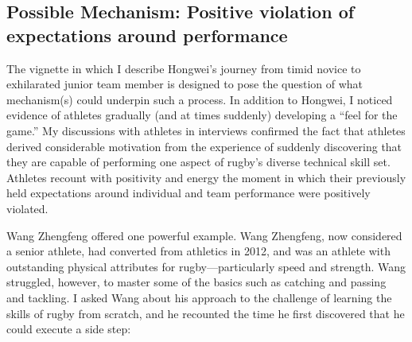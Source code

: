\begin{CJK}{UTF8}{gbsn}









\subsection{Possible Mechanism: Positive violation of expectations around performance}

The vignette in which I describe Hongwei's journey from timid novice to exhilarated junior team member is designed to pose the question of what mechanism(s) could underpin such a process.  In addition to Hongwei, I noticed evidence of athletes gradually (and at times suddenly) developing a ``feel for the game.''  My discussions with athletes in interviews confirmed the fact that athletes derived considerable motivation from the experience of suddenly discovering that they are capable of performing one aspect of rugby's diverse technical skill set.  Athletes recount with positivity and energy the moment in which their previously held expectations around individual and team performance were positively violated.

Wang Zhengfeng offered one powerful example.  Wang Zhengfeng, now considered a senior athlete, had converted from athletics in 2012, and was an athlete with outstanding physical attributes for rugby---particularly speed and strength. Wang struggled, however, to master some of the basics such as catching and passing and tackling.  I asked Wang about his approach to the challenge of learning the skills of rugby from scratch, and he recounted the time he first discovered that he could execute a side step:


\end{CJK}
